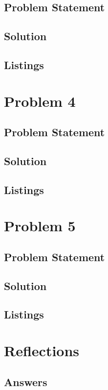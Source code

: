 \documentclass[12pt,a4paper,titlepage,oneside]{article}
\begin{document}
\subsection{Problem Statement}


\subsection{Solution}

\subsection{Listings}

\newpage
\section{Problem 4}

\subsection{Problem Statement}


\subsection{Solution}

\subsection{Listings}

\newpage
\section{Problem 5}

\subsection{Problem Statement}


\subsection{Solution}

\subsection{Listings}

\newpage
\section{Reflections}



\subsection{Answers}
\end{document}
